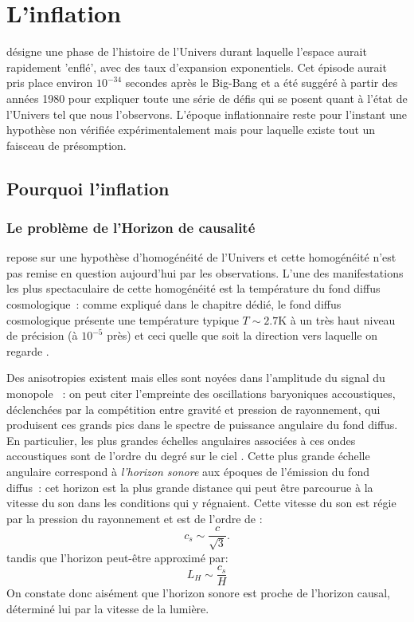 \chapter{L'inflation}
 désigne une phase de l'histoire de l'Univers durant laquelle l'espace aurait rapidement 'enflé', avec des taux d'expansion exponentiels. Cet épisode aurait pris place environ $10^{-34}$ secondes après le Big-Bang et a été suggéré à partir des années 1980 pour expliquer toute une série de défis qui se posent quant à l'état de l'Univers tel que nous l'observons. L'époque inflationnaire reste pour l'instant une hypothèse non vérifiée expérimentalement mais pour laquelle existe tout un faisceau de présomption.

\section{Pourquoi l'inflation}
\subsection{Le problème de l'Horizon de causalité}
 repose sur une hypothèse d'homogénéité de l'Univers et cette homogénéité n'est pas remise en question aujourd'hui par les observations. L'une des manifestations les plus spectaculaire de cette homogénéité est la température du fond diffus cosmologique~: comme expliqué dans le chapitre dédié, le fond diffus cosmologique présente une température typique $T\sim 2.7 $K à un très haut niveau de précision (à $10^{-5}$ près) et ceci quelle que soit la direction vers laquelle on regarde . 

Des anisotropies existent mais elles sont noyées dans l'amplitude du signal du monopole~ : on peut citer l'empreinte des oscillations baryoniques accoustiques, déclenchées par la compétition entre gravité et pression de rayonnement, qui produisent ces grands pics dans le spectre de puissance angulaire du fond diffus. En particulier, les plus grandes échelles angulaires associées à ces ondes accoustiques sont de l'ordre du degré sur le ciel . Cette plus grande échelle angulaire correspond à \textit{l'horizon sonore} aux époques de l'émission du fond diffus~: cet horizon est la plus grande distance qui peut être parcourue à la vitesse du son dans les conditions qui y régnaient. Cette vitesse du son est régie par la pression du rayonnement et est de l'ordre de :
\begin{equation}
c_s\sim \frac{c}{\sqrt 3}.
\end{equation}
tandis que l'horizon peut-être approximé par:
\begin{equation}
L_H\sim\frac{c_s}{H}
\end{equation}
On constate donc aisément que l'horizon sonore est proche de l'horizon causal, déterminé lui par la vitesse de la lumière.

